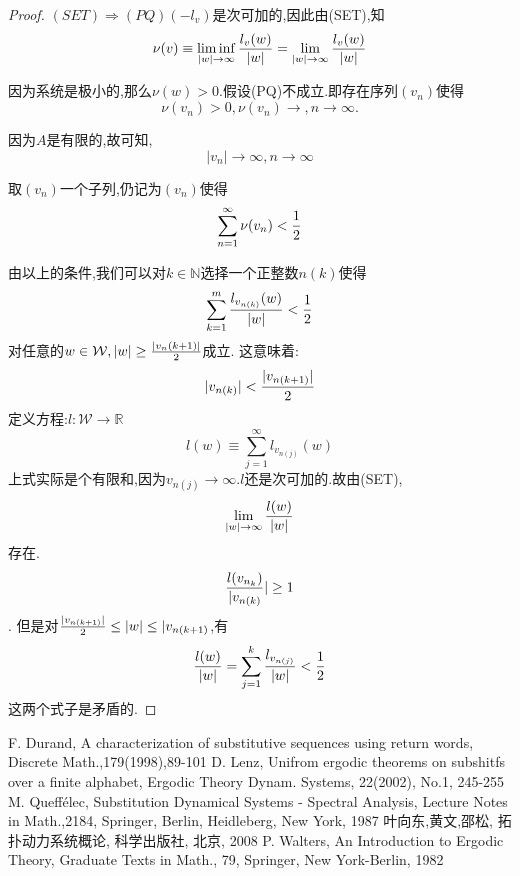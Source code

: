 \documentclass[a4paper,11pt,oneside]{book}
\begin{document}
\begin{proof}
$(SET)\Rightarrow(PQ)$$(-l_v)$是次可加的,因此由(SET),知$$\nu(v)\equiv \liminf_{|w|\to\infty}{l_v(w)\over |w|}=\lim_{|w|\to\infty}{l_v(w)\over |w|}$$

因为系统是极小的,那么$\nu(w)>0$.假设(PQ)不成立.即存在序列$(v_n)$使得
$$\nu(v_n)>0,\nu(v_n)\rightarrow, n\rightarrow \infty.$$

因为$A$是有限的,故可知,$$|v_n|\rightarrow \infty, n\rightarrow \infty$$

取$(v_n)$一个子列,仍记为$(v_n)$使得$$\sum_{n=1}^{\infty}\nu(v_n)<{1\over 2}$$

由以上的条件,我们可以对$k\in\mathbb{N}$选择一个正整数$n(k)$使得
$$\sum_{k=1}^m {l_{v_{n(k)}}(w)\over |w|}<{1\over 2}$$
对任意的$w\in \mathcal{W},|w|\geq {|v_n(k+1)|\over 2}$成立.
这意味着:
$$|v_{n(k)}|<{|v_{n(k+1)}|\over 2}$$
定义方程:$l:\mathcal{W}\rightarrow \mathbb{R}$
$$l(w)\equiv \sum_{j=1}^\infty l_{v_{n(j)}}(w)$$
上式实际是个有限和,因为$v_{n(j)}\rightarrow\infty$.$l$还是次可加的.故由(SET),
$$\lim_{|w|\to\infty}{l(w)\over |w|}$$
存在.
$${l(v_{n_k})\over |v_{n(k)}}|\geq 1$$.
但是对${|v_{n(k+1)}|\over 2}\leq |w| \leq |v_{n(k+1)}$,有
$${l(w)\over |w|}=\sum_{j=1}^k {l_{v_{n(j)}}\over |w|}<\frac{1}{2}$$
这两个式子是矛盾的.
\end{proof}


\renewcommand\bibname{\centerline {参考文献}}
%
%

\begin{thebibliography}{10}
 F. Durand, A characterization of substitutive sequences using return words, Discrete Math.,179(1998),89-101
 D. Lenz, Unifrom ergodic theorems on subshitfs over a finite alphabet, Ergodic Theory Dynam. Systems, 22(2002), No.1, 245-255
 M. Queff\'elec, Substitution Dynamical Systems - Spectral Analysis, Lecture Notes in Math.,2184, Springer, Berlin, Heidleberg, New York, 1987
 叶向东,黄文,邵松, 拓扑动力系统概论, 科学出版社, 北京, 2008
 P. Walters, An Introduction to Ergodic Theory, Graduate Texts in Math., 79, Springer, New York-Berlin, 1982




\end{thebibliography}
\end{document}
